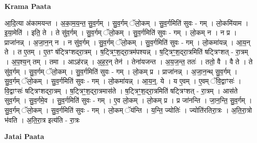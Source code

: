 \documentclass[17pt]{extarticle}
\begin{document}
\textbf{Krama Paata} \newline

आ॒दि॒त्या अ॑कामयन्त । अ॒का॒म॒य॒न्त॒ सु॒व॒र्गम् । सु॒व॒र्गम् ॅलो॒कम् । सु॒व॒र्गमिति॑ सुवः - गम् । लो॒कमि॑याम । इ॒या॒मेति॑ । इति॒ ते । ते सु॑व॒र्गम् । सु॒व॒र्गम् ॅलो॒कम् । सु॒व॒र्गमिति॑ सुवः - गम् । लो॒कम् न । न प्र । प्राजा॑नन्न् । अ॒जा॒न॒न् न । न सु॑व॒र्गम् । सु॒व॒र्गम् ॅलो॒कम् । सु॒व॒र्गमिति॑ सुवः - गम् । लो॒कमा॑यन्न् । आ॒य॒न् ते । त ए॒तम् । ए॒तꣳ ष॑ट्त्रिꣳशद्‍रा॒त्रम् । ष॒ट्त्रिꣳ॒॒श॒द्‍रा॒त्रम॑पश्यन्न् । ष॒ट्त्रिꣳ॒॒श॒द्‍रा॒त्रमिति॑ षट्त्रिꣳशत् - रा॒त्रम् । अ॒प॒श्य॒न् तम् । तमा । आऽह॑रन्न् । अ॒ह॒र॒न् तेन॑ । तेना॑यजन्त । अ॒य॒ज॒न्त॒ ततः॑ । ततो॒ वै । वै ते । ते सु॑व॒र्गम् । सु॒व॒र्गम् ॅलो॒कम् । सु॒व॒र्गमिति॑ सुवः - गम् । लो॒कम् प्र । प्राजा॑नन्न् । अ॒जा॒न॒न्थ् सु॒व॒र्गम् । सु॒व॒र्गम् ॅलो॒कम् । सु॒व॒र्गमिति॑ सुवः - गम् । लो॒कमा॑यन्न् । आ॒य॒न्॒. ये । य ए॒वम् । ए॒वम् ॅवि॒द्वाꣳसः॑ । वि॒द्वाꣳसः॑ षट्त्रिꣳशद्‍रा॒त्रम् । ष॒ट्त्रिꣳ॒॒श॒द्‍रा॒त्रमास॑ते । ष॒ट्त्रिꣳ॒॒श॒द्‍रा॒त्रमिति॑ षट्त्रिꣳशत् - रा॒त्रम् । आस॑ते सुव॒र्गम् । सु॒व॒र्गमे॒व । सु॒व॒र्गमिति॑ सुवः - गम् । ए॒व लो॒कम् । लो॒कम् प्र । प्र जा॑नन्ति । जा॒न॒न्ति॒ सु॒व॒र्गम् । सु॒व॒र्गम् ॅलो॒कम् । सु॒व॒र्गमिति॑ सुवः - गम् । लो॒कम् ॅय॑न्ति । य॒न्ति॒ ज्योतिः॑ । ज्योति॑रतिरा॒त्रः । अ॒ति॒रा॒त्रो भ॑वति । अ॒ति॒रा॒त्र इत्य॑ति - रा॒त्रः \newline

\textbf{Jatai Paata} \newline
\end{document}
